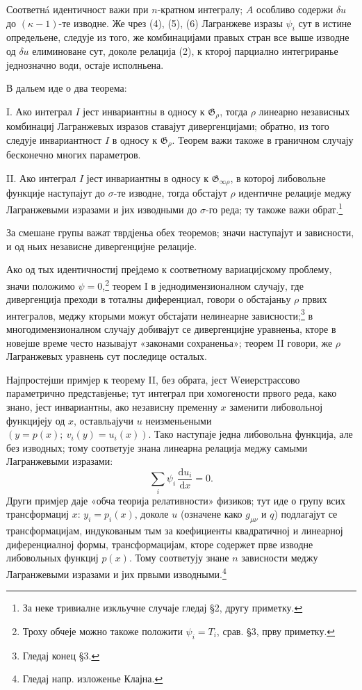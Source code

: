 ﻿\documentclass[11pt]{article}
\providecommand{\G}{\mathfrak G}
\providecommand{\dd}{\mathrm d}
\begin{document}
Соответнá идентичност важи при \(n\)-кратном интегралу; \(A\) особливо содержи \(\delta u\) до \((\kappa-1)\)-те изводне. Же чрез (4), (5), (6) Лагранжеве изразы \(\psi_i\) сут в истине определьене, следује из того, же комбинацијами правых стран все выше изводне од \(\delta u\) елиминоване сут, доколе релација (2), к кторој парциално интегриранье једнозначно води, остаје исполньена.

В дальем иде о два теорема:

I. Ако интеграл \(I\) јест инвариантны в односу к \(\G_\rho\), тогда \(\rho\) линеарно независных комбинациј Лагранжевых изразов ставајут дивергенцијами; обратно, из того следује инвариантност \(I\) в односу к \(\G_\rho\). Теорем важи такоже в граничном случају бесконечно многих параметров.

II. Ако интеграл \(I\) јест инвариантны в односу к \(\G_{\infty\rho}\), в которој либовольне функције наступајут до \(\sigma\)-те изводне, тогда обстајут \(\rho\) идентичне релације меджу Лагранжевыми изразами и јих изводными до \(\sigma\)-го реда; ту такоже важи обрат.\footnote{За неке тривиалне изкльучне случаје гледај \S{}2, другу приметку.}

За смешане групы важат тврдјеньа обех теоремов; значи наступајут и зависности, и од ньих независне дивергенцијне релације.

Ако од тых идентичностиј прејдемо к соответному вариацијскому проблему, значи положимо \(\psi=0\),\footnote{Троху обчеје можно такоже положити \(\psi_i=T_i\), срав. \S{}3, прву приметку.} теорем I в једнодимензионалном случају, где дивергенција преходи в тоталны диференциал, говори о обстајаньу \(\rho\) првих интегралов, меджу кторыми можут обстајати нелинеарне зависности;\footnote{Гледај конец \S{}3.} в многодимензионалном случају добивајут се дивергенцијне уравненьа, кторе в новејше време често называјут «законами сохраненьа»; теорем II говори, же \(\rho\) Лагранжевых уравнень сут последице осталых.

Најпростејши примјер к теорему II, без обрата, јест Wеиерстрассово параметрично представјенье; тут интеграл при хомогености првого реда, како знано, јест инвариантны, ако независну пременну \(x\) заменити либовольној функцијеју од \(x\), оставльајучи \(u\) неизменьеными \((y=p(x);\ v_i(y)=u_i(x))\). Тако наступаје једна либовольна функција, але без изводных; тому соответује знана линеарна релација меджу самыми Лагранжевыми изразами:
\[
\sum_i \psi_i\,\frac{\dd u_i}{\dd x}=0.
\]
Други примјер даје «обча теорија релативности» физиков; тут иде о групу всих трансформациј \(x\): \(y_i=p_i(x)\), доколе \(u\) (означене како \(g_{\mu\nu}\) и \(q\)) подлагајут се трансформацијам, индукованым тым за коефициенты квадратичној и линеарној диференциалној формы, трансформацијам, кторе содержет прве изводне либовольных функциј \(p(x)\). Тому соответују знане \(n\) зависности меджу Лагранжевыми изразами и јих првыми изводными.\footnote{Гледај напр. изложенье Клајна.}
\end{document}
